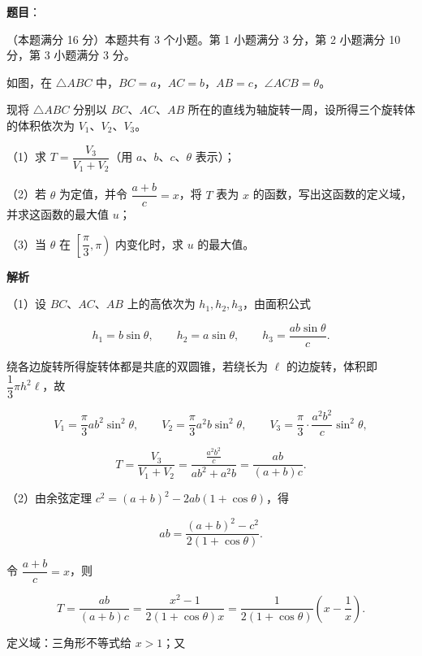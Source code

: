 \begin{answer}

\textbf{题目}：

（本题满分 16 分）本题共有 3 个小题。第 1 小题满分 3 分，第 2 小题满分 10 分，第 3 小题满分 3 分。

如图，在 $\triangle ABC$ 中，$BC=a$，$AC=b$，$AB=c$，$\angle ACB=\theta$。
\nopagebreak[4]
\begin{center}\end{center}
\nopagebreak[4]
现将 $\triangle ABC$ 分别以 $BC$、$AC$、$AB$ 所在的直线为轴旋转一周，设所得三个旋转体的体积依次为 $V_{1}$、$V_{2}$、$V_{3}$。

（1）求 $T=\dfrac{V_{3}}{V_{1}+V_{2}}$（用 $a$、$b$、$c$、$\theta$ 表示）；

（2）若 $\theta$ 为定值，并令 $\dfrac{a+b}{c}=x$，将 $T$ 表为 $x$ 的函数，写出这函数的定义域，并求这函数的最大值 $u$；

（3）当 $\theta$ 在 $\left[\dfrac{\pi}{3},\pi\right)$ 内变化时，求 $u$ 的最大值。

\textbf{解析}

（1）设 $BC$、$AC$、$AB$ 上的高依次为 $h_{1},h_{2},h_{3}$，由面积公式

\nopagebreak[4]
\[
h_{1}=b\sin\theta,\qquad h_{2}=a\sin\theta,\qquad h_{3}=\frac{ab\sin\theta}{c}.
\]

绕各边旋转所得旋转体都是共底的双圆锥，若绕长为 $\ell$ 的边旋转，体积即 $\dfrac{1}{3}\pi h^{2}\ell$，故

\nopagebreak[4]
\[
V_{1}=\frac{\pi}{3}ab^{2}\sin^{2}\theta,\qquad
V_{2}=\frac{\pi}{3}a^{2}b\sin^{2}\theta,\qquad
V_{3}=\frac{\pi}{3}\cdot\frac{a^{2}b^{2}}{c}\sin^{2}\theta,
\]

\nopagebreak[4]
\[
T=\frac{V_{3}}{V_{1}+V_{2}}
=\frac{\frac{a^{2}b^{2}}{c}}{ab^{2}+a^{2}b}
=\frac{ab}{(a+b)c}.
\]

（2）由余弦定理 $c^{2}=(a+b)^{2}-2ab(1+\cos\theta)$，得

\nopagebreak[4]
\[
ab=\frac{(a+b)^{2}-c^{2}}{2(1+\cos\theta)}.
\]

令 $\dfrac{a+b}{c}=x$，则

\nopagebreak[4]
\[
T=\frac{ab}{(a+b)c}
=\frac{x^{2}-1}{2(1+\cos\theta)x}
=\frac{1}{2(1+\cos\theta)}\left(x-\frac{1}{x}\right).
\]

定义域：三角形不等式给 $x>1$；又


\end{answer}
